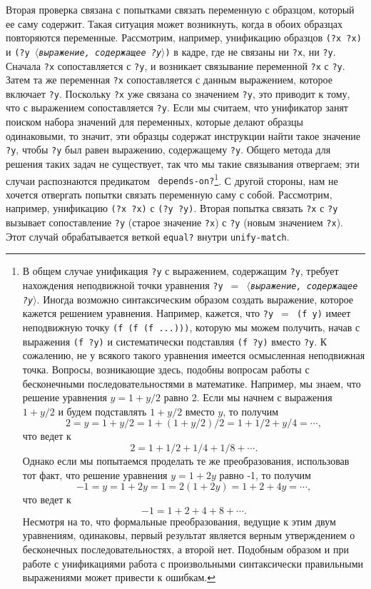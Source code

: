 Вторая проверка связана с попытками связать переменную с
образцом, который ее саму содержит.  Такая ситуация может возникнуть,
когда в обоих образцах повторяются переменные.  Рассмотрим, например,
унификацию образцов {\tt (?x ?x)} и {\tt (?y
\textit{$\langle$выражение, содержащее {\tt ?y}$\rangle$})} в
кадре, где не связаны ни {\tt ?x}, ни {\tt ?y}.  Сначала
{\tt ?x} сопоставляется с {\tt ?y}, и возникает
связывание переменной {\tt ?x} с {\tt ?y}.  Затем
та же переменная {\tt ?x} сопоставляется с данным выражением,
которое включает {\tt ?y}.  Поскольку {\tt ?x} уже
связана со значением {\tt ?y}, это приводит к тому, что с
выражением сопоставляется {\tt ?y}.  Если мы считаем, что
унификатор занят поиском набора значений для переменных, которые делают
образцы одинаковыми, то значит, эти образцы содержат инструкции найти
такое значение {\tt ?y}, чтобы {\tt ?y} был равен
выражению, содержащему {\tt ?y}.  Общего метода для решения
таких задач не существует, так что мы такие связывания отвергаем; эти
случаи распознаются предикатом {\tt 
depends-on?}\footnote{В 
общем случае унификация {\tt ?y} с 
выражением, содержащим {\tt ?y}, требует нахождения неподвижной
точки уравнения {\tt ?y $=$ \textit{$\langle$выражение, содержащее
{\tt ?y}$\rangle$}}.  Иногда возможно синтаксическим
образом создать выражение, которое кажется решением уравнения.
Например, кажется, что {\tt ?y $=$ (f y)} имеет неподвижную
точку {\tt (f (f (f ...)))}, которую мы можем получить,
начав с выражения {\tt (f ?y)} и систематически подставляя
{\tt (f ?y)} вместо {\tt ?y}.  К сожалению, не у всякого
такого уравнения имеется осмысленная неподвижная точка.  Вопросы,
возникающие здесь, подобны вопросам работы с 
бесконечными
последовательностями в математике.  Например, мы знаем, что решение
уравнения $y = 1 + y/2$ равно 2.  Если мы начнем с
выражения $1 + y/2$ и будем подставлять $1 + y/2$ вместо
$y$, то получим
$$
2 = y = 1 + y/2 = 1 + (1 + y/2)/2 = 1 + 1/2 + y/4 = \cdots,
$$
что ведет к
$$
2 = 1 + 1/2 + 1/4 + 1/8 + \cdots.
$$
Однако если мы попытаемся проделать те же преобразования, использовав
тот факт, что решение уравнения $y = 1 + 2y$ равно -1, то получим
$$
-1 = y = 1 + 2y = 1 = 2(1+2y) = 1 + 2 + 4y = \cdots,
$$
что ведет к
$$
-1 = 1 + 2 + 4 + 8 + \cdots.
$$
Несмотря на то, что формальные преобразования, ведущие к этим двум
уравнениям, одинаковы, первый результат является верным утверждением о
бесконечных последовательностях, а второй нет.  Подобным образом и при
работе с унификациями работа с произвольными синтаксически
правильными выражениями может привести к ошибкам.}.
С другой стороны, нам не хочется отвергать попытки связать переменную
саму с собой. Рассмотрим, например, унификацию 
{\tt (?x ?x)} с {\tt (?y ?y)}.  Вторая попытка связать
{\tt ?x} с {\tt ?y} вызывает сопоставление
{\tt ?y} (старое значение {\tt ?x}) с {\tt ?y}
(новым значением {\tt ?x}).  Этот случай обрабатывается веткой
{\tt equal?} внутри {\tt unify-match}.

